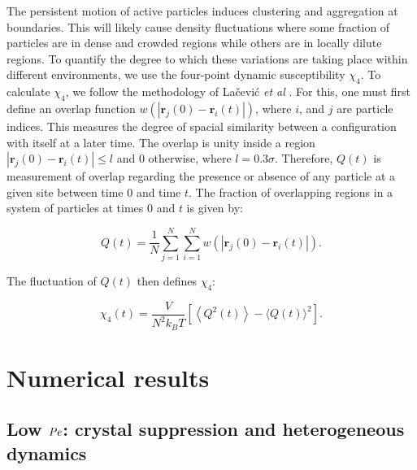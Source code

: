 The persistent motion of active particles induces clustering and aggregation at boundaries. This will likely cause density fluctuations where some fraction of particles are in dense and crowded regions while others are in locally dilute regions. To quantify the degree to which these variations are taking place within different environments, we use the four-point dynamic susceptibility $\chi_4$. To calculate $\chi_4$, we follow the methodology of Lačević \textit{et al} \cite{lacevic2003a}. For this, one must first define an overlap function $w\left(\left|\mathbf{r}_{j}(0)-\mathbf{r}_{i}(t)\right|\right)$, where $i$, and $j$ are particle indices. This measures the degree of spacial similarity between a configuration with itself at a later time. The overlap is unity inside a region  $\left|\mathbf{r}_{j}(0)-\mathbf{r}_{i}(t)\right| \leq l$ and $0$ otherwise, where $l = 0.3 \sigma$. Therefore, $Q(t)$ is measurement of overlap regarding the presence or absence of any particle at a given site between time $0$ and time $t$. The fraction of overlapping regions in a system of particles at times $0$ and $t$ is given by:
 
  
\begin{equation}	
	Q(t)=\frac{1}{N} \sum_{j=1}^{N} \sum_{i=1}^{N} w\left(\left|\mathbf{r}_{j}(0)-\mathbf{r}_{i}(t)\right|\right).
	\label{eq:Overlap}
\end{equation}

\noindent The fluctuation of $Q(t)$ then defines $\chi_4$:

\begin{equation}
	\chi_{4}(t)=\frac{V}{N^{2} k_{B} T}\left[\left\langle Q^{2}(t)\right\rangle-\langle Q(t)\rangle^{2}\right].
	\label{eq:chi4}
\end{equation}


\section{Numerical results}
\label{section:results}
\subsection{Low $\operatorname{\mathit{P\kern-.08em e}}$: crystal suppression and heterogeneous dynamics}

